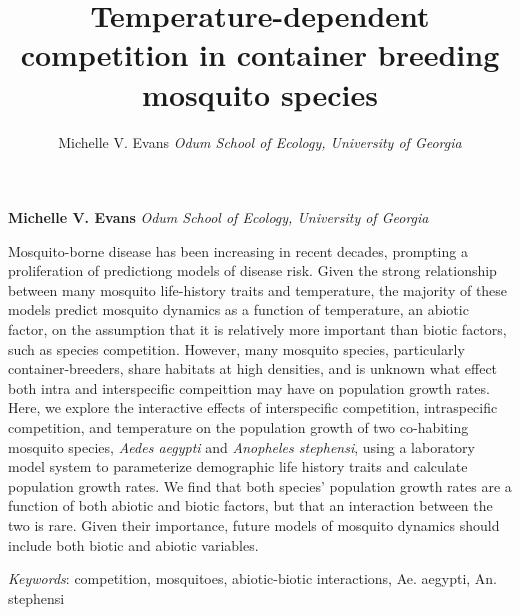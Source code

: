 \documentclass[12pt,]{article}
\title{Temperature-dependent competition in container breeding mosquito species  }
\author{\Large Michelle V. Evans\vspace{0.05in} \newline\normalsize\emph{Odum School of Ecology, University of Georgia}  }
\date{}
\newcommand*{\authorfont}{\fontfamily{phv}\selectfont}
\renewenvironment{abstract}
 {{%
    \setlength{\leftmargin}{0mm}
    \setlength{\rightmargin}{\leftmargin}%
  }%
  \relax}
 {\endlist}
\begin{document}
%

{%
\setlength{\parindent}{0pt}
\thispagestyle{plain}
{\fontsize{18}{20}\selectfont\raggedright
\maketitle  %

}

{
   \vskip 13.5pt\relax \normalsize\fontsize{11}{12}
\textbf{\authorfont Michelle V. Evans} \hskip 15pt \emph{\small Odum School of Ecology, University of Georgia}

}

}








\begin{abstract}

    \hbox{\vrule height .2pt width 39.14pc}

    \vskip 8.5pt %

\noindent Mosquito-borne disease has been increasing in recent decades, prompting
a proliferation of predictiong models of disease risk. Given the strong
relationship between many mosquito life-history traits and temperature,
the majority of these models predict mosquito dynamics as a function of
temperature, an abiotic factor, on the assumption that it is relatively
more important than biotic factors, such as species competition.
However, many mosquito species, particularly container-breeders, share
habitats at high densities, and is unknown what effect both intra and
interspecific compeittion may have on population growth rates. Here, we
explore the interactive effects of interspecific competition,
intraspecific competition, and temperature on the population growth of
two co-habiting mosquito species, \emph{Aedes aegypti} and
\emph{Anopheles stephensi}, using a laboratory model system to
parameterize demographic life history traits and calculate population
growth rates. We find that both species' population growth rates are a
function of both abiotic and biotic factors, but that an interaction
between the two is rare. Given their importance, future models of
mosquito dynamics should include both biotic and abiotic variables.


\vskip 8.5pt \noindent \emph{Keywords}: competition, mosquitoes, abiotic-biotic interactions, Ae. aegypti, An. stephensi \par

    \hbox{\vrule height .2pt width 39.14pc}



\end{abstract}
\end{document}
